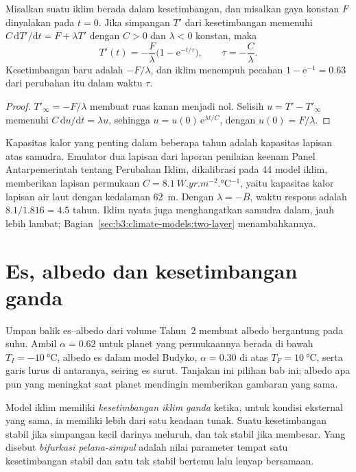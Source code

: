 \begin{theorem}\label{thm:b3:climate-models:response}
Misalkan suatu iklim berada dalam kesetimbangan, dan misalkan gaya konstan $F$ dinyalakan
pada $t = 0$. Jika simpangan $T'$ dari kesetimbangan memenuhi $C\,\mathrm
dT'/\mathrm dt = F + \lambda T'$ dengan $C > 0$ dan $\lambda < 0$ konstan,
maka
\[
T'(t) = -\frac{F}{\lambda}\Big(1 - \mathrm e^{-t/\tau}\Big), \qquad
\tau = -\frac{C}{\lambda} .
\]
Kesetimbangan baru adalah $-F/\lambda$, dan iklim menempuh pecahan $1
- \mathrm e^{-1} = \num{0.63}$ dari perubahan itu dalam waktu $\tau$.
\end{theorem}

\begin{proof}
$T'_\infty = -F/\lambda$ membuat ruas kanan menjadi nol. Selisih
$u = T' - T'_\infty$ memenuhi $C\,\mathrm du/\mathrm dt = \lambda u$, sehingga $u =
u(0)\,\mathrm e^{\lambda t/C}$, dengan $u(0) = F/\lambda$.
\end{proof}

Kapasitas kalor yang penting dalam beberapa tahun adalah kapasitas lapisan atas samudra.
Emulator dua lapisan dari laporan penilaian keenam
Panel Antarpemerintah tentang Perubahan Iklim, dikalibrasi pada 44 model iklim,
memberikan lapisan permukaan $C = \qty{8.1}{W.yr.m^{-2}.\celsius^{-1}}$, yaitu kapasitas
kalor lapisan air laut dengan kedalaman \qty{62}{m}. Dengan $\lambda = -B$, waktu
respons adalah $8.1/1.816 = \num{4.5}\text{ tahun}$. Iklim nyata juga menghangatkan
samudra dalam, jauh lebih lambat; Bagian~\ref{sec:b3:climate-models:two-layer}
menambahkannya.

\section{Es, albedo dan kesetimbangan ganda}\label{sec:b3:climate-models:multiple}

Umpan balik es--albedo dari volume Tahun~2 membuat albedo bergantung pada
suhu. Ambil $\alpha = 0.62$ untuk planet yang permukaannya berada di bawah
$T_I = \qty{-10}{\celsius}$, albedo es dalam model Budyko, $\alpha
= 0.30$ di atas $T_F = \qty{+10}{\celsius}$, serta garis lurus di antaranya,
seiring es surut. Tanjakan ini pilihan bab ini; albedo apa pun yang
meningkat saat planet mendingin memberikan gambaran yang sama.

\begin{definition}\label{def:b3:climate-models:multiple-equilibria}
Model iklim memiliki \emph{kesetimbangan iklim ganda}
ketika, untuk kondisi eksternal yang sama, ia memiliki lebih dari
satu keadaan tunak. Suatu kesetimbangan stabil jika simpangan kecil darinya
meluruh, dan tak stabil jika membesar. Yang disebut \emph{bifurkasi
pelana-simpul} adalah nilai parameter tempat
satu kesetimbangan stabil dan satu tak stabil bertemu lalu lenyap bersamaan.
\end{definition}

